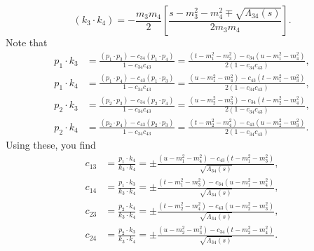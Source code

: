 \begin{equation}
	\left( k_{3} \cdot k_{4} \right) = - \frac{m_{3} m_{4}}{2} \left[ \frac{s - m_{3}^{2} - m_{4}^{2} \mp \sqrt{\Lambda_{34}(s)}}{2m_{3} m_{4}} \right].
\end{equation}
Note that
\begin{align}
	p_{1} \cdot k_{3} &= \frac{ \left( p_{1} \cdot p_{3} \right) - c_{34} \left( p_{1} \cdot p_{4} \right) }{1 - c_{34} c_{43}} = \frac{ \left( t - m_{1}^{2} - m_{3}^{2} \right) - c_{34} \left( u - m_{1}^{2} - m_{4}^{2} \right) }{2 \left( 1 - c_{34} c_{43} \right)}, \\
	p_{1} \cdot k_{4} &= \frac{ \left( p_{1} \cdot p_{4} \right) - c_{43} \left( p_{1} \cdot p_{3} \right) }{1 - c_{34} c_{43}} = \frac{ \left( u - m_{1}^{2} - m_{4}^{2} \right) - c_{43} \left( t - m_{1}^{2} - m_{3}^{2} \right) }{2 \left( 1 - c_{34} c_{43} \right)}, \\
	p_{2} \cdot k_{3} &= \frac{ \left( p_{2} \cdot p_{3} \right) - c_{34} \left( p_{2} \cdot p_{4} \right) }{1 - c_{34} c_{43}} = \frac{ \left( u - m_{2}^{2} - m_{3}^{2} \right) - c_{34} \left( t - m_{2}^{2} - m_{4}^{2} \right) }{2 \left( 1 - c_{34} c_{43} \right)}, \\
	p_{2} \cdot k_{4} &= \frac{ \left( p_{2} \cdot p_{4} \right) - c_{43} \left( p_{2} \cdot p_{3} \right) }{1 - c_{34} c_{43}} = \frac{ \left( t - m_{2}^{2} - m_{4}^{2} \right) - c_{43} \left( u - m_{2}^{2} - m_{3}^{2} \right) }{2 \left( 1 - c_{34} c_{43} \right)}.
\end{align}
Using these, you find
\begin{align}
	c_{13} &= \frac{p_{1} \cdot k_{4}}{k_{3} \cdot k_{4}} = \pm \frac{ \left( u - m_{1}^{2} - m_{4}^{2} \right) - c_{43} \left( t - m_{1}^{2} - m_{3}^{2} \right) }{\sqrt{\Lambda_{34}(s)}}, \\
	c_{14} &= \frac{p_{1} \cdot k_{3}}{k_{3} \cdot k_{4}} = \pm \frac{ \left( t - m_{1}^{2} - m_{3}^{2} \right) - c_{34} \left( u - m_{1}^{2} - m_{4}^{2} \right) }{\sqrt{\Lambda_{34}(s)}}, \\
	c_{23} &= \frac{p_{2} \cdot k_{4}}{k_{3} \cdot k_{4}} = \pm \frac{ \left( t - m_{2}^{2} - m_{4}^{2} \right) - c_{43} \left( u - m_{2}^{2} - m_{3}^{2} \right) }{\sqrt{\Lambda_{34}(s)}}, \\
	c_{24} &= \frac{p_{2} \cdot k_{3}}{k_{3} \cdot k_{4}} = \pm \frac{ \left( u - m_{2}^{2} - m_{3}^{2} \right) - c_{34} \left( t - m_{2}^{2} - m_{4}^{2} \right) }{\sqrt{\Lambda_{34}(s)}}.
\end{align}
